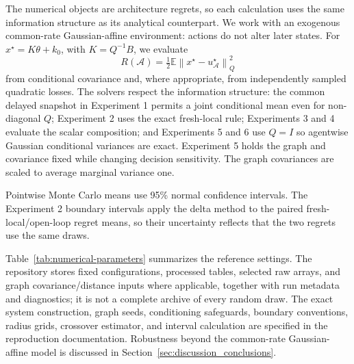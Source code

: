 \documentclass[11pt]{article}
\begin{document}
The numerical objects are architecture regrets, so each calculation uses the
same information structure as its analytical counterpart.  We work with an
exogenous common-rate Gaussian-affine environment: actions do not alter later
states.  For
$x^\star=K\theta+k_0$, with $K=Q^{-1}B$, we evaluate
\begin{equation*}
    R(\mathcal A)=\tfrac12\mathbb E
    \left\|x^\star-u_{\mathcal A}^\star\right\|_Q^2
\end{equation*}
from conditional covariance and, where appropriate, from independently
sampled quadratic losses.  The solvers respect the information structure: the
common delayed snapshot in Experiment 1 permits a joint conditional mean even
for non-diagonal $Q$; Experiment 2 uses the exact fresh-local rule; Experiments
3 and 4 evaluate the scalar composition; and Experiments 5 and 6 use $Q=I$ so
agentwise Gaussian conditional variances are exact.  Experiment 5 holds the
graph and covariance fixed while changing decision sensitivity.  The graph
covariances are scaled to average marginal variance one.

Pointwise Monte Carlo means use 95\% normal confidence intervals.  The
Experiment 2 boundary intervals apply the delta method to the paired
fresh-local/open-loop regret means, so their uncertainty reflects that
the two regrets use the same draws.

Table~\ref{tab:numerical-parameters} summarizes the reference settings.  The
repository stores fixed configurations, processed tables, selected raw arrays,
and graph covariance/distance inputs where applicable, together with run
metadata and diagnostics; it is not a complete archive of every random draw.
The exact system construction, graph seeds, conditioning safeguards, boundary
conventions, radius grids, crossover estimator, and interval calculation are
specified in the reproduction documentation.  Robustness beyond the
common-rate Gaussian-affine model is discussed in
Section~\ref{sec:discussion_conclusions}.
\end{document}
